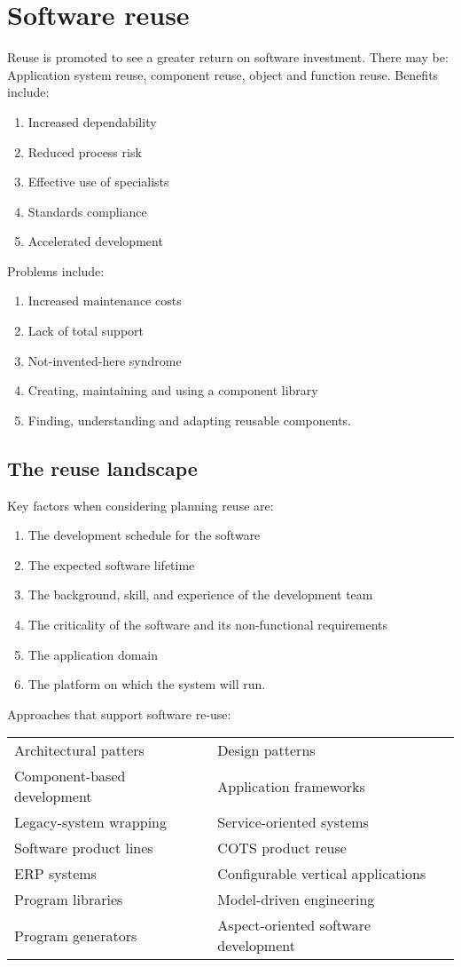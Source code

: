 \documentclass{article}
\begin{document}
 
\setcounter{section}{15}
\section{Software reuse}
Reuse is promoted to see a greater return on software investment.
There may be:
Application system reuse, component reuse, object and function reuse.
Benefits include:
\begin{enumerate}
\item Increased dependability
\item Reduced process risk
\item Effective use of specialists
\item Standards compliance
\item Accelerated development
\end{enumerate}
Problems include:
\begin{enumerate}
\item Increased maintenance costs
\item Lack of total support
\item Not-invented-here syndrome
\item Creating, maintaining and using a component library
\item Finding, understanding and adapting reusable components.
\end{enumerate}
\subsection{The reuse landscape}
Key factors when considering planning reuse are:
\begin{enumerate}
\item The development schedule for the software
\item The expected software lifetime
\item The background, skill, and experience of the development team
\item The criticality of the software and its non-functional requirements
\item The application domain
\item The platform on which the system will run.
\end{enumerate}
Approaches that support software re-use:
\begin{center}
\begin{tabular}{l l}
Architectural patters & Design patterns\\
Component-based development & Application frameworks\\
Legacy-system wrapping & Service-oriented systems\\
Software product lines & COTS product reuse\\
ERP systems & Configurable vertical applications\\
Program libraries & Model-driven engineering\\
Program generators & Aspect-oriented software development
\end{tabular}
\end{center}
\end{document}
